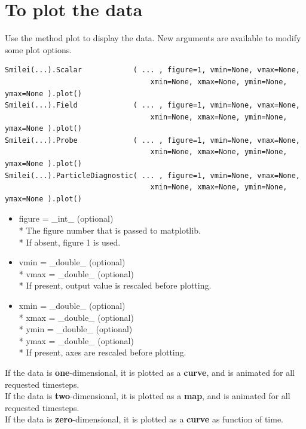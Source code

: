 \documentclass[11pt]{article}
\newcommand{\code}[1]{\colorbox{yellow!15}{\ttfamily #1}}
\begin{document}
\section{To plot the data}
Use the method \code{plot} to display the data. New arguments are available to modify some plot options.
\begin{lstlisting}
Smilei(...).Scalar            ( ... , figure=1, vmin=None, vmax=None,
                                  xmin=None, xmax=None, ymin=None, ymax=None ).plot()
Smilei(...).Field             ( ... , figure=1, vmin=None, vmax=None,
                                  xmin=None, xmax=None, ymin=None, ymax=None ).plot()
Smilei(...).Probe             ( ... , figure=1, vmin=None, vmax=None,
                                  xmin=None, xmax=None, ymin=None, ymax=None ).plot()
Smilei(...).ParticleDiagnostic( ... , figure=1, vmin=None, vmax=None,
                                  xmin=None, xmax=None, ymin=None, ymax=None ).plot()
\end{lstlisting}

\begin{itemize}
\item \code{figure} = \code{\_int\_}       (optional)\\*
	The figure number that is passed to matplotlib.\\*
	If absent, figure 1 is used.

\item \code{vmin} = \code{\_double\_}    (optional)\\*
	\code{vmax} = \code{\_double\_}    (optional)\\*
	If present, output value is rescaled before plotting.

\item \code{xmin} = \code{\_double\_}    (optional)\\*
	\code{xmax} = \code{\_double\_}    (optional)\\*
	\code{ymin} = \code{\_double\_}    (optional)\\*
	\code{ymax} = \code{\_double\_}    (optional)\\*
	If present, axes are rescaled before plotting.
\end{itemize}

If the data is \textbf{one}-dimensional, it is plotted as a \textbf{curve}, and is animated for all requested timesteps.\\
If the data is \textbf{two}-dimensional, it is plotted as a \textbf{map}, and is animated for all requested timesteps.\\
If the data is \textbf{zero}-dimensional, it is plotted as a \textbf{curve} as function of time.\\
\end{document}
